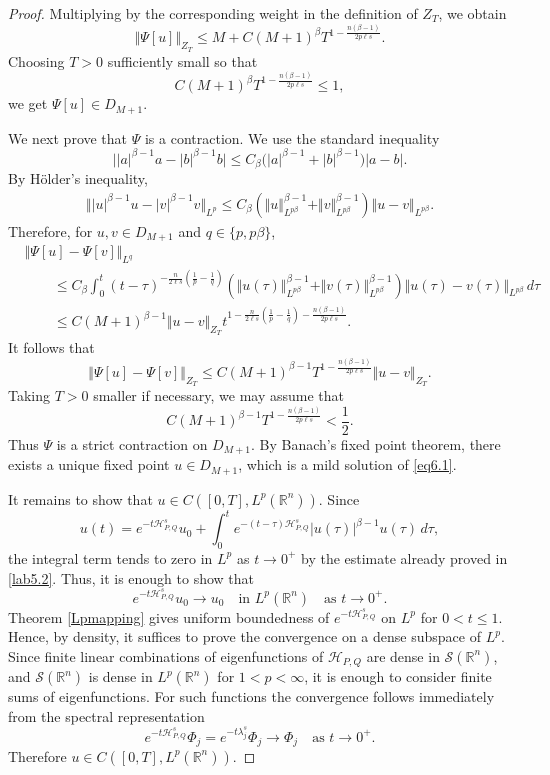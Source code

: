 \documentclass[12pt, reqno]{amsart}
\theoremstyle{definition}
\theoremstyle{remark}
\numberwithin{equation}{section}
\newcommand{\APQ}{\mathcal{H}_{P, Q}}
\begin{document}
\begin{proof}
Multiplying by the corresponding weight in the definition of $Z_T$, we obtain
\[
    \Vert \Psi[u]\Vert_{Z_T}
    \leq
    M
    +
    C(M+1)^\beta
    T^{1-\frac{n(\beta-1)}{2p\ell s}}.
\]
Choosing $T>0$ sufficiently small so that
\[
    C(M+1)^\beta
    T^{1-\frac{n(\beta-1)}{2p\ell s}}
    \leq
    1,
\]
we get $\Psi[u]\in D_{M+1}$.

We next prove that $\Psi$ is a contraction. We use the standard inequality
\[
    \big|
    |a|^{\beta-1}a-|b|^{\beta-1}b
    \big|
    \leq
    C_\beta
    \big(|a|^{\beta-1}+|b|^{\beta-1}\big)|a-b|.
\]
By H\"older's inequality,
\[
\begin{aligned}
\Vert
|u|^{\beta-1}u-|v|^{\beta-1}v
\Vert_{L^p}
\leq
C_\beta
\left(
\Vert u\Vert_{L^{p\beta}}^{\beta-1}
+
\Vert v\Vert_{L^{p\beta}}^{\beta-1}
\right)
\Vert u-v\Vert_{L^{p\beta}}.
\end{aligned}
\]
Therefore, for $u,v\in D_{M+1}$ and $q\in\{p,p\beta\}$,
\[
\begin{aligned}
&\Vert \Psi [u]-\Psi [v]\Vert_{L^q}
\\
&\qquad
\leq
C_\beta
\int_0^t
(t-\tau)^{-\frac{n}{2\ell s}\left(\frac1p-\frac1q\right)}
\left(
\Vert u(\tau)\Vert_{L^{p\beta}}^{\beta-1}
+
\Vert v(\tau)\Vert_{L^{p\beta}}^{\beta-1}
\right)
\Vert u(\tau)-v(\tau)\Vert_{L^{p\beta}}
\,d\tau
\\
&\qquad
\leq
C(M+1)^{\beta-1}
\Vert u-v\Vert_{Z_T}
t^{
1-\frac{n}{2\ell s}\left(\frac1p-\frac1q\right)
-\frac{n(\beta-1)}{2p\ell s}
}.
\end{aligned}
\]
It follows that
\[
    \Vert \Psi[u]-\Psi[v]\Vert_{Z_T}
    \leq
    C(M+1)^{\beta-1}
    T^{1-\frac{n(\beta-1)}{2p\ell s}}
    \Vert u-v\Vert_{Z_T}.
\]
Taking $T>0$ smaller if necessary, we may assume that
\[
    C(M+1)^{\beta-1}
    T^{1-\frac{n(\beta-1)}{2p\ell s}}
    <
    \frac12.
\]
Thus $\Psi$ is a strict contraction on $D_{M+1}$. By Banach's fixed point theorem, there exists a unique fixed point $u\in D_{M+1}$, which is a mild solution of \eqref{eq6.1}.

It remains to show that $u\in C([0,T],L^p(\mathbb R^n)).$
Since
\[
    u(t)
    =
    e^{-t\APQ^s}u_0
    +
    \int_0^t
    e^{-(t-\tau)\APQ^s}
    |u(\tau)|^{\beta-1}u(\tau)\,d\tau,
\]
the integral term tends to zero in $L^p$ as $t\to0^+$ by the estimate already proved in \eqref{lab5.2}. Thus, it is enough to show that
\[
    e^{-t\APQ^s}u_0\to u_0
    \quad
    \text{in } L^p(\mathbb R^n)
    \quad
    \text{as } t\to0^+.
\]
Theorem \ref{Lpmapping} gives uniform boundedness of $e^{-t\APQ^s}$ on $L^p$ for $0<t\leq1$. Hence, by density, it suffices to prove the convergence on a dense subspace of $L^p$. Since finite linear combinations of eigenfunctions of $\APQ$ are dense in $\mathcal S(\mathbb R^n)$, and $\mathcal S(\mathbb R^n)$ is dense in $L^p(\mathbb R^n)$ for $1<p<\infty$, it is enough to consider finite sums of eigenfunctions. For such functions the convergence follows immediately from the spectral representation
\[
    e^{-t\APQ^s}\Phi_j
    =
    e^{-t\lambda_j^s}\Phi_j
    \to
    \Phi_j
    \quad
    \text{as }t\to0^+.
\]
Therefore $u\in C([0,T],L^p(\mathbb R^n))$.


\end{proof}
\end{document}
